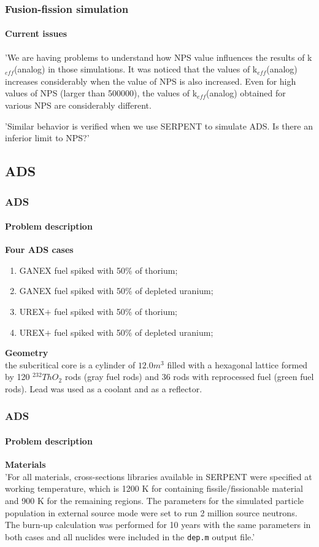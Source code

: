 \documentclass[svgnames,smaller,table,draft]{beamer}
\begin{document}
\begin{frame}
  \frametitle{Fusion-fission simulation}
  \framesubtitle{Current issues}

  'We are having problems to understand how NPS value influences the results of k$_{eff}$(analog) in those simulations. It was noticed that the values of k$_{eff}$(analog) increases considerably when the value of NPS is also increased. Even for high values of NPS (larger than 500000), the values of  k$_{eff}$(analog) obtained for various NPS are considerably different. %
  \vspace{10px}

'Similar behavior is verified when we use SERPENT to simulate ADS. Is there an inferior limit to NPS?'
\end{frame}


\subsection{ADS}
\begin{frame}
  \frametitle{ADS}
  \framesubtitle{Problem description}
  \textbf{Four ADS cases}
  \begin{enumerate}
    \item GANEX fuel spiked with 50\% of thorium;
  \item GANEX fuel spiked with 50\% of depleted uranium;
  \item UREX$+$ fuel spiked with 50\% of thorium;
  \item UREX$+$ fuel spiked with 50\% of depleted uranium;
  \end{enumerate}
  \vspace{10px}
  \textbf{Geometry}\\
  the subcritical core is a cylinder of $12.0m^3$ filled with a hexagonal lattice formed by 120 $^{232}ThO_2$ rods (gray fuel rods) and 36 rods with reprocessed fuel (green fuel rods). Lead was used as a coolant and as a reflector.
\end{frame}

\begin{frame}
  \frametitle{ADS}
  \framesubtitle{Problem description}
  \textbf{Materials}\\
  \vspace{10px}
  'For all materials, cross-sections libraries available in SERPENT were specified at working temperature, which is 1200 K for containing fissile/fissionable material and 900 K for the remaining regions. The parameters for the simulated particle population in external source mode were set to run 2 million source neutrons. The burn-up calculation was performed for 10 years with the same parameters in both cases and all nuclides were included in the \texttt{dep.m} output file.'  

\end{frame}
\end{document}
